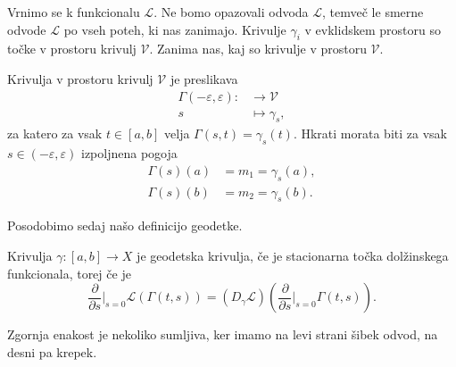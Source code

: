 Vrnimo se k funkcionalu $\mathcal{L}$. Ne bomo opazovali odvoda $\mathcal{L}$, temveč le smerne odvode $\mathcal{L}$ po vseh poteh, ki nas zanimajo. Krivulje $\gamma_i$ v evklidskem prostoru so točke v prostoru krivulj $\mathcal{V}$. Zanima nas,
kaj so krivulje v prostoru $\mathcal{V}$.

\begin{definicija}
\label{def_krivulja_v_prostoru_krivulj}
Krivulja v prostoru krivulj $\mathcal{V}$ je preslikava \begin{align*}
    \Gamma  (-\varepsilon, \varepsilon): &\longrightarrow \mathcal{V} \\
    s &\longmapsto \gamma_s,
\end{align*}
za katero za vsak $t \in  [a,b]$ velja $\Gamma(s,t) = \gamma_s(t)$. Hkrati morata biti za vsak $s \in (-\varepsilon, \varepsilon)$ izpoljnena pogoja \begin{align*}
    \Gamma(s)(a) &= m_1 = \gamma_s(a), \\
    \Gamma(s)(b) &= m_2 = \gamma_s(b).
\end{align*}
\end{definicija}

Posodobimo sedaj našo definicijo geodetke.

\begin{definicija}
\label{def_posodobljne_geodetkse_krivulje}
Krivulja $\gamma : [a,b] \to  X$ je geodetska krivulja, če je stacionarna točka dolžinskega funkcionala, torej če je \begin{equation*}
\frac{ \partial  }{ \partial s} \bigg|_{s = 0} \mathcal{L}(\Gamma(t,s)) = (D_\gamma \mathcal{L}) \left( \frac{ \partial  }{ \partial s} \bigg|_{s = 0} \Gamma(t,s) \right) . 
\end{equation*}    
\end{definicija}

\begin{opomba}
Zgornja enakost je nekoliko sumljiva, ker imamo na levi strani šibek odvod, na desni pa krepek.
\end{opomba}

